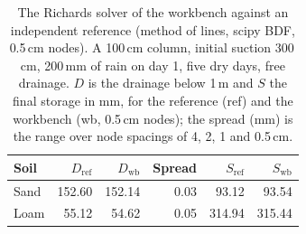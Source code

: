 \begin{table}[H]\centering\small
\caption{The Richards solver of the workbench against an independent reference (method of lines, scipy BDF, 0.5\,cm nodes). A 100\,cm column, initial suction 300\,cm, 200\,mm of rain on day 1, five dry days, free drainage. $D$ is the drainage below 1\,m and $S$ the final storage in mm, for the reference (ref) and the workbench (wb, 0.5\,cm nodes); the spread (mm) is the range over node spacings of 4, 2, 1 and 0.5\,cm.}\label{tab:richards}
\begin{tabular}{lrrrrr}\toprule
Soil & $D_{\mathrm{ref}}$ & $D_{\mathrm{wb}}$ & Spread & $S_{\mathrm{ref}}$ & $S_{\mathrm{wb}}$\\\midrule
Sand & 152.60 & 152.14 & 0.03 & 93.12 & 93.54\\
Loam & 55.12 & 54.62 & 0.05 & 314.94 & 315.44\\
\bottomrule\end{tabular}\end{table}